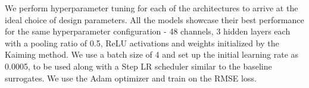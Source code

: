 We perform hyperparameter tuning for each of the architectures to arrive at the ideal choice of design parameters. All the models showcase their best performance for the same hyperparameter configuration - 48 channels, 3 hidden layers each with a pooling ratio of 0.5, ReLU activations and weights initialized by the Kaiming method. We use a batch size of 4 and set up the initial learning rate as 0.0005, to be used along with a Step LR scheduler similar to the baseline surrogates. We use the Adam optimizer and train on the RMSE loss. 
